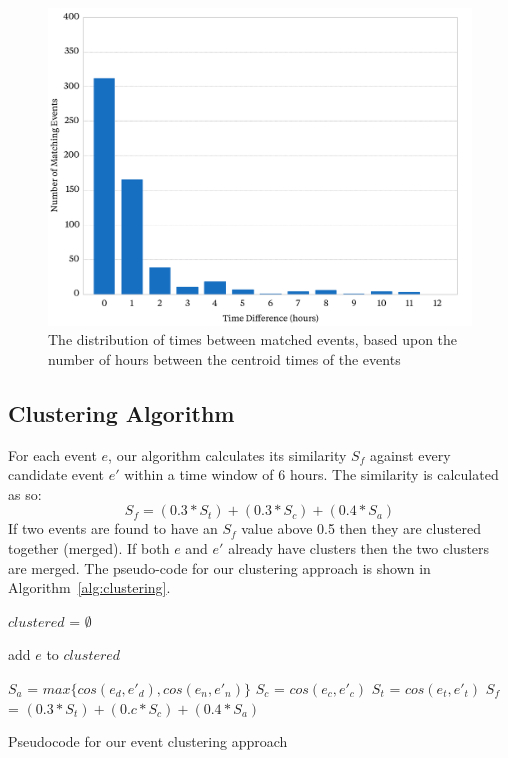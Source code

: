 \begin{figure}
	\includegraphics[width=\textwidth]{./Chapters/Collection/images/times}
	\caption{The distribution of times between matched events, based upon the number of hours between the centroid times of the events}
	\label{fig:dif_diff}
\end{figure}

\subsection{Clustering Algorithm}
\label{sec:clusteringalg}
For each event \(e\), our algorithm calculates its similarity $S_f$ against every candidate event \(e'\) within a time window of 6 hours.
The similarity is calculated as so:
\begin{equation} \label{eq:simcluster}
S_{f} = (0.3 * S_{t}) + (0.3 * S_{c}) + (0.4 * S_{a})
\end{equation}
If two events are found to have an \(S_{f}\) value above 0.5 then they are clustered together (merged).
If both \(e\) and \(e'\) already have clusters then the two clusters are merged.
The pseudo-code for our clustering approach is shown in Algorithm~\ref{alg:clustering}.

\begin{algorithm}
$clustered$ = $\emptyset$\;
 {
	add $e$ to $clustered$\;
	 {

		$S_{a}$ = $max\{cos(e_d, e'_d), cos(e_n, e'_n)\}$\;
		$S_{c}$ = $cos(e_c, e'_c)$\;
		$S_{t}$ = $cos(e_t, e'_t)$\;
		$S_{f}$ = $(0.3 * S_{t}) + (0.c * S_{c}) + (0.4 * S_{a})$\;
		 {
			 
		}
	}
}
\caption{Pseudocode for our event clustering approach}
\label{alg:clustering}
\end{algorithm}

